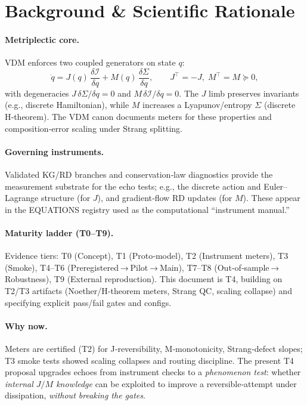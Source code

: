 \documentclass{article}
\begin{document}
\section{Background \& Scientific Rationale}

\paragraph{Metriplectic core.}
VDM enforces two coupled generators on state $q$:
\begin{equation}
\dot q = J(q)\,\frac{\delta \mathcal{I}}{\delta q} + M(q)\,\frac{\delta \Sigma}{\delta q},
\qquad J^\top=-J,\; M^\top = M \succeq 0,
\label{eq:metriplectic}
\end{equation}
with degeneracies $J\,\delta\Sigma/\delta q = 0$ and $M\,\delta\mathcal{I}/\delta q = 0$. The $J$ limb preserves invariants (e.g., discrete Hamiltonian), while $M$ increases a Lyapunov/entropy $\Sigma$ (discrete H‑theorem). The VDM canon documents meters for these properties and composition‑error scaling under Strang splitting.

\paragraph{Governing instruments.}
Validated KG/RD branches and conservation‑law diagnostics provide the measurement substrate for the echo tests; e.g., the discrete action and Euler–Lagrange structure (for $J$), and gradient‑flow RD updates (for $M$). These appear in the EQUATIONS registry used as the computational ``instrument manual.''

\paragraph{Maturity ladder (T0–T9).}
Evidence tiers: T0 (Concept), T1 (Proto‑model), T2 (Instrument meters), T3 (Smoke), T4–T6 (Preregistered → Pilot → Main), T7–T8 (Out‑of‑sample → Robustness), T9 (External reproduction). This document is T4, building on T2/T3 artifacts (Noether/H‑theorem meters, Strang QC, scaling collapse) and specifying explicit pass/fail gates and configs.

\paragraph{Why now.}
Meters are certified (T2) for J‑reversibility, M‑monotonicity, Strang‑defect slopes; T3 smoke tests showed scaling collapses and routing discipline. The present T4 proposal upgrades echoes from instrument checks to a \emph{phenomenon test}: whether \emph{internal $J/M$ knowledge} can be exploited to improve a reversible‑attempt under dissipation, \emph{without breaking the gates}.
\end{document}
